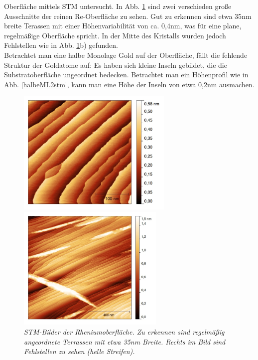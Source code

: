 Oberfläche mittels STM untersucht. In Abb. \ref{rekristallstm} sind zwei verschieden große
Ausschnitte der reinen Re-Oberfläche zu sehen. Gut zu erkennen sind etwa 35nm breite Terassen mit
einer Höhenvariabilität von ca. 0,4nm, was für eine plane, regelmäßige Oberfläche spricht. In der
Mitte des Kristalls wurden jedoch Fehlstellen wie in Abb. \ref{rekristallstm}b) gefunden.\\
Betrachtet man eine halbe Monolage Gold auf der Oberfläche, fällt die fehlende Struktur der
Goldatome auf: Es haben sich kleine Inseln gebildet, die die Substratoberfläche ungeordnet bedecken.
Betrachtet man ein Höhenprofil wie in Abb. \ref{halbeML2stm}, kann man eine Höhe der Inseln von
etwa 0,2nm ausmachen.


\begin{figure}[htbp]
	\begin{minipage}[b]{0.5\textwidth} 
		\includegraphics[height=6cm]{rekristall1.jpg}
	\end{minipage}
	\hfill
	\begin{minipage}[b]{0.5\textwidth}
		\includegraphics[height=6cm]{rekristall2.jpg}
	\end{minipage}
	\caption{\textit{STM-Bilder der Rheniumoberfläche. Zu erkennen sind regelmäßig angeordnete
	Terrassen mit etwa 35nm Breite. Rechts im Bild sind Fehlstellen zu sehen (helle Streifen).}}
	\label{rekristallstm} 


\end{figure}
